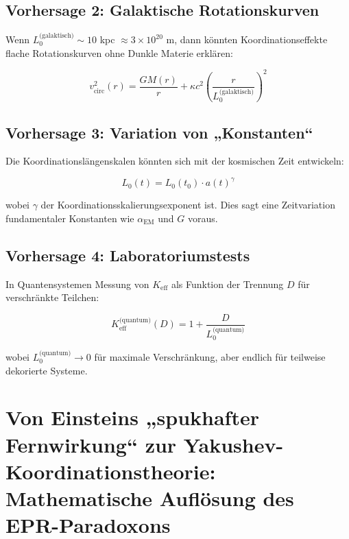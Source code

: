 \documentclass[11pt,a4paper]{article}
\begin{document}
	\subsection{Vorhersage 2: Galaktische Rotationskurven}
	
	Wenn $L_0^{\text{(galaktisch)}} \sim 10$ kpc $\approx 3\times10^{20}$ m, dann könnten Koordinationseffekte flache Rotationskurven ohne Dunkle Materie erklären:
	
	\begin{equation}
		v_{\text{circ}}^2(r) = \frac{GM(r)}{r} + \kappa c^2 \left(\frac{r}{L_0^{\text{(galaktisch)}}}\right)^2
	\end{equation}
	
	\subsection{Vorhersage 3: Variation von „Konstanten“}
	
	Die Koordinationslängenskalen könnten sich mit der kosmischen Zeit entwickeln:
	
	\begin{equation}
		L_0(t) = L_0(t_0) \cdot a(t)^\gamma
	\end{equation}
	
	wobei $\gamma$ der Koordinationsskalierungsexponent ist. Dies sagt eine Zeitvariation fundamentaler Konstanten wie $\alpha_{\text{EM}}$ und $G$ voraus.
	
	\subsection{Vorhersage 4: Laboratoriumstests}
	
	In Quantensystemen Messung von $K_{\mathrm{eff}}$ als Funktion der Trennung $D$ für verschränkte Teilchen:
	
	\begin{equation}
		K_{\mathrm{eff}}^{\text{(quantum)}}(D) = 1 + \frac{D}{L_0^{\text{(quantum)}}}
	\end{equation}
	
	wobei $L_0^{\text{(quantum)}} \to 0$ für maximale Verschränkung, aber endlich für teilweise dekorierte Systeme.
	
	\section{Von Einsteins „spukhafter Fernwirkung“ zur Yakushev-Koordinationstheorie: Mathematische Auflösung des EPR-Paradoxons}
	\label{sec:einstein-paradox}
	
\end{document}
